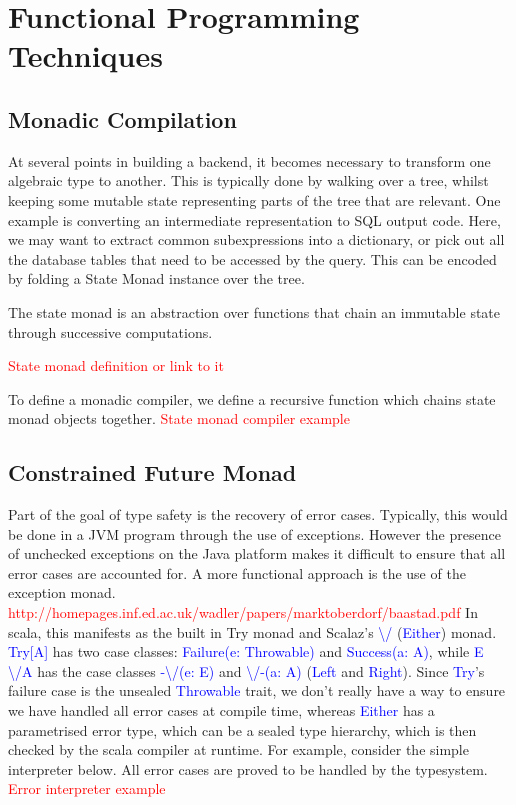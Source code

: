 \documentclass[12pt,a4paper,twoside,openright]{report}
\newcommand\todo[1]{\textcolor{red}{#1}}
\newcommand\codeName[1]{\textcolor{blue}{#1}}
\newcommand\either[0]{\textbackslash/}
\newcommand\eitherR[0]{\textbackslash/-}
\newcommand\eitherL[0]{-\textbackslash/}
\begin{document}
\section{Functional Programming Techniques}
	\subsection{Monadic Compilation}
	At several points in building a backend, it becomes necessary to transform one algebraic type to another. This is typically done by walking over a tree, whilst keeping some mutable state representing parts of the tree that are relevant. One example is converting an intermediate representation to SQL output code. Here, we may want to extract common subexpressions into a dictionary, or pick out all the database tables that need to be accessed by the query. This can be encoded by folding a State Monad instance over the tree.

The state monad is an abstraction over functions that chain an immutable state through successive computations.

\todo{State monad definition or link to it}

To define a monadic compiler, we define a recursive function which chains state monad objects together.
\todo{State monad compiler example}

	\subsection{Constrained Future Monad}
	Part of the goal of type safety is the recovery of error cases. Typically, this would be done in a JVM program through the use of exceptions. However the presence of unchecked exceptions on the Java platform makes it difficult to ensure that all error cases are accounted for. A more functional approach is the use of the exception monad. \todo{http://homepages.inf.ed.ac.uk/wadler/papers/marktoberdorf/baastad.pdf} In scala, this manifests as the built in Try monad and Scalaz’s \codeName{\either} (\codeName{Either}) monad. \codeName{Try[A]} has two case classes: \codeName{Failure(e: Throwable)} and \codeName{Success(a: A)}, while \codeName{E \either A} has the case classes \codeName{\eitherL(e: E)} and \codeName{\eitherR(a: A)} (\codeName{Left} and \codeName{Right}). Since \codeName{Try}’s failure case is the unsealed \codeName{Throwable} trait, we don’t really have a way to ensure we have handled all error cases at compile time, whereas \codeName{Either} has a parametrised error type, which can be a sealed type hierarchy, which is then checked by the scala compiler at runtime. For example, consider the simple interpreter below. All error cases are proved to be handled by the typesystem.
\todo{Error interpreter example}	
\end{document}
